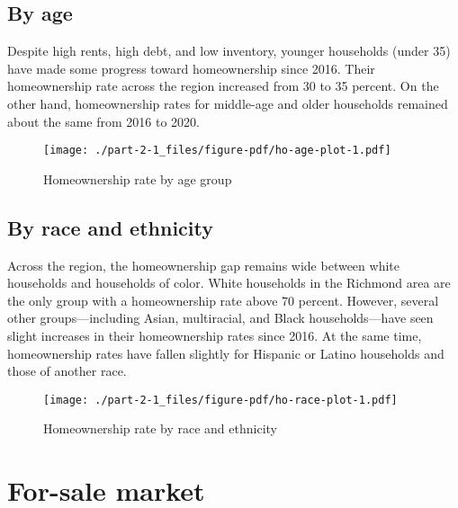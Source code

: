 \documentclass[
  letterpaper,
  DIV=11,
  numbers=noendperiod]{scrreprt}
\begin{document}
\hypertarget{by-age-1}{%
\subsection{By age}\label{by-age-1}}

Despite high rents, high debt, and low inventory, younger households
(under 35) have made some progress toward homeownership since 2016.
Their homeownership rate across the region increased from 30 to 35
percent. On the other hand, homeownership rates for middle-age and older
households remained about the same from 2016 to 2020.

\begin{figure}

{\centering \texttt{[image: ./part-2-1\_files/figure-pdf/ho-age-plot-1.pdf]}

}

\caption{Homeownership rate by age group}

\end{figure}

\hypertarget{by-race-and-ethnicity}{%
\subsection{By race and ethnicity}\label{by-race-and-ethnicity}}

Across the region, the homeownership gap remains wide between white
households and households of color. White households in the Richmond
area are the only group with a homeownership rate above 70 percent.
However, several other groups---including Asian, multiracial, and Black
households---have seen slight increases in their homeownership rates
since 2016. At the same time, homeownership rates have fallen slightly
for Hispanic or Latino households and those of another race.

\begin{figure}

{\centering \texttt{[image: ./part-2-1\_files/figure-pdf/ho-race-plot-1.pdf]}

}

\caption{Homeownership rate by race and ethnicity}

\end{figure}

\hypertarget{for-sale-market}{%
\section{For-sale market}\label{for-sale-market}}
\end{document}
